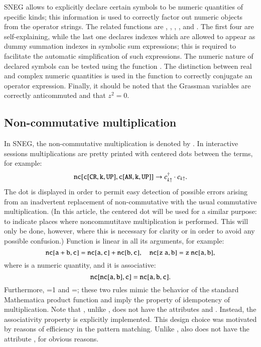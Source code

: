 \documentclass[3p,number,preprint]{elsarticle}
\begin{document}
SNEG allows to explicitly declare certain symbols to be numeric
quantities of specific kinds; this information is used to correctly
factor out numeric objects from the operator strings. The related
functions are , ,
, , and
. The first four are self-explaining, while the
last one declares indexes which are allowed to appear as dummy
summation indexes in symbolic sum expressions; this is required to
facilitate the automatic simplification of such expressions. The
numeric nature of declared symbols can be tested using the function
. The distinction between real and complex numeric
quantities is used in the function  to correctly conjugate
an operator expression. Finally, it should be noted that the Grassman
variables are correctly anticommuted and that $z^2=0$.


\subsection{Non-commutative multiplication}

In SNEG, the non-commutative multiplication is denoted by . In
interactive sessions  multiplications are pretty printed with 
centered dots between the terms, for example:
%
\begin{equation}
{\tt nc[c[CR,k,UP], c[AN,k,UP]]} \to c^\dag_{k\uparrow} \cdot
c_{k\uparrow}.
\end{equation}
%
The dot is displayed in order to permit easy detection of possible
errors arising from an inadvertent replacement of non-commutative
with the usual commutative multiplication. (In this article, the
centered dot will be used for a similar purpose: to indicate places
where noncommutitave multiplication is performed. This will only be
done, however, where this is necessary for clarity or in order to
avoid any possible confusion.) Function  is linear in all its
arguments, for example:
%
\begin{equation}
{\tt nc[a+b,c]} = {\tt nc[a,c]}+{\tt nc[b,c]}, \quad
{\tt nc[z\ a,b]} = {\tt z}\ {\tt nc[a,b]},
\end{equation}
%
where  is a numeric quantity, and it is associative: 
%
\begin{equation}
{\tt nc[nc[a,b],c]} = {\tt nc[a,b,c]}.
\end{equation}
%
Furthermore, =1 and =; these two rules
mimic the behavior of the standard Mathematica product function
 and imply the property of idempotency of multiplication.
Note that , unlike , does not have the attributes
 and . Instead, the associativity property
is explicitly implemented. This design choice was motivated by reasons
of efficiency in the pattern matching. Unlike , 
also does not have the attribute , for obvious reasons.
\end{document}
